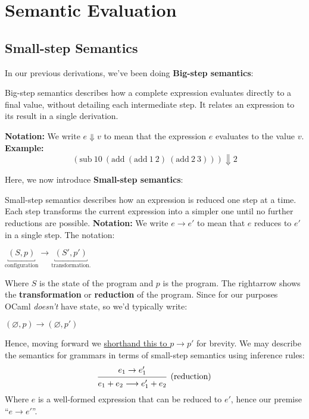 \newpage
\section{Semantic Evaluation}
\subsection{Small-step Semantics}

\noindent
In our previous derivations, we've been doing \textbf{Big-step semantics}:

\begin{Def}

    Big-step semantics describes how a complete expression evaluates directly to a final value, without detailing each intermediate step. It relates an expression to its result in a single derivation.
    
    \medskip
    \noindent\textbf{Notation:} We write $e \Downarrow v$ to mean that the expression $e$ evaluates to the value $v$.\\
    \noindent\textbf{Example:}
    \[
    (\text{sub}\ 10\ (\text{add}\ (\text{add}\ 1\ 2)\ (\text{add}\ 2\ 3))) \Downarrow 2
    \]
    \end{Def}

\noindent
Here, we now introduce \textbf{Small-step semantics}:

\begin{Def}

    Small-step semantics describes how an expression is reduced one step at a time. Each step transforms the current expression into a simpler one until no further reductions are possible.
    \noindent\textbf{Notation:} We write $e \rightarrow e'$ to mean that $e$ reduces to $e'$ in a single step.
    The notation:
    \begin{center}
    \LARGE
    $\underbracket{(S,p)}_{\text{configuration}} \longrightarrow \underbracket{(S',p')}_{\text{transformation.}}$
    \normalsize
    \end{center}
    \noindent
    Where $S$ is the state of the program and $p$ is the program. The rightarrow shows the \textbf{transformation} or \textbf{reduction} of the program. Since
    for our purposes OCaml \textit{doesn't} have state, so we'd typically write:
    \begin{center}
    \LARGE
    $(\varnothing, p) \longrightarrow (\varnothing,p')$
    \normalsize
    \end{center}
    \noindent
    Hence, moving forward we \underline{shorthand this to $p \rightarrow p'$} for brevity. We may describe the semantics for 
    grammars in terms of small-step semantics using inference rules:
    \Large
    \[
    \begin{prooftree}
    \hypo{e_1 \rightarrow e_1'}
    \Infer1[(\text{reduction})]{e_1 + e_2 \longrightarrow e_1' + e_2}
    \end{prooftree}
    \]
    \normalsize
    \noindent
    Where $e$ is a well-formed expression that can be reduced to $e'$, hence our premise ``$e \rightarrow e'$''.

\end{Def}

